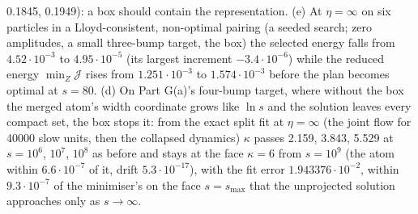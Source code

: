 0.1845, 0.1949): a box should contain the representation. (e) At $\eta = \infty$ on six particles in a
Lloyd-consistent, non-optimal pairing (a seeded search; zero amplitudes, a small three-bump target, the box) the
selected energy falls from $4.52\cdot10^{-3}$ to $4.95\cdot10^{-5}$ (its largest increment $-3.4\cdot10^{-6}$) while
the reduced energy $\min_Z\mathcal{J}$ rises from $1.251\cdot10^{-3}$ to $1.574\cdot10^{-3}$ before the plan becomes
optimal at $s = 80$. (d) On Part G(a)'s four-bump target, where without the box the merged atom's width coordinate
grows like $\ln s$ and the solution leaves every compact set, the box stops it: from the exact split fit at
$\eta = \infty$ (the joint flow for 40000 slow units, then the collapsed dynamics) $\kappa$ passes 2.159, 3.843, 5.529
at $s = 10^6$, $10^7$, $10^8$ as before and stays at the face $\kappa = 6$ from $s = 10^9$ (the atom within
$6.6\cdot10^{-7}$ of it, drift $5.3\cdot10^{-17}$), with the fit error $1.943376\cdot10^{-2}$, within
$9.3\cdot10^{-7}$ of the minimiser's on the face $s = s_{\max}$ that the unprojected solution approaches only as
$s\to\infty$.


